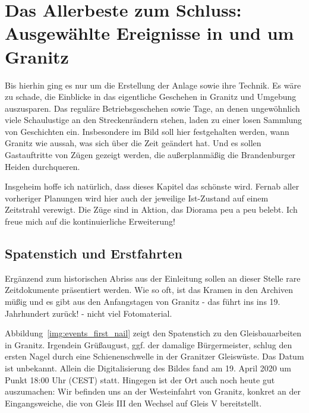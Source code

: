\section{Das Allerbeste zum Schluss: Ausgew\"ahlte Ereignisse in und um Granitz}
\label{sec:events}

Bis hierhin ging es nur um die Erstellung der Anlage sowie ihre Technik.
Es w\"are zu schade, die Einblicke in das eigentliche Geschehen in Granitz und Umgebung auszusparen.
Das regul\"are Betriebsgeschehen sowie Tage, an denen ungew\"ohnlich viele Schaulustige an den Streckenr\"andern stehen, laden zu einer losen Sammlung von Geschichten ein.
Insbesondere im Bild soll hier festgehalten werden, wann Granitz wie aussah, was sich \"uber die Zeit ge\"andert hat.
Und es sollen Gastauftritte von Z\"ugen gezeigt werden, die au{\ss}erplanm\"a{\ss}ig die Brandenburger Heiden durchqueren.

Insgeheim hoffe ich nat\"urlich, dass dieses Kapitel das sch\"onste wird.
Fernab aller vorheriger Planungen wird hier auch der jeweilige Ist-Zustand auf einem Zeitstrahl verewigt.
Die Z\"uge sind in Aktion, das Diorama peu a peu belebt.
Ich freue mich auf die kontinuierliche Erweiterung!


\subsection{Spatenstich und Erstfahrten}
\label{sec:firstNail}

Erg\"anzend zum historischen Abriss aus der Einleitung sollen an dieser Stelle rare Zeitdokumente pr\"asentiert werden.
Wie so oft, ist das Kramen in den Archiven m\"u{\ss}ig und es gibt aus den Anfangstagen von Granitz - das f\"uhrt ins ins 19. Jahrhundert zur\"uck! - nicht viel Fotomaterial.

Abbildung~\ref{img:events_first_nail} zeigt den Spatenstich zu den Gleisbauarbeiten in Granitz.
Irgendein Gr\"u{\ss}august, ggf. der damalige B\"urgermeister, schlug den ersten Nagel durch eine Schienenschwelle in der Granitzer Gleisw\"uste.
Das Datum ist unbekannt.
Allein die Digitalisierung des Bildes fand am 19. April 2020 um Punkt 18:00 Uhr (CEST) statt.
Hingegen ist der Ort auch noch heute gut auszumachen:
Wir befinden uns an der Westeinfahrt von Granitz, konkret an der Eingangsweiche, die von Gleis III den Wechsel auf Gleis V bereitstellt.

